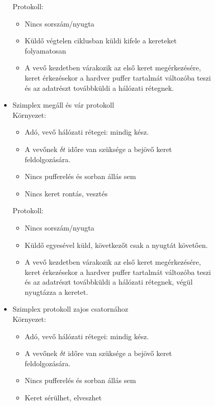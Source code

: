 \documentclass[margin=0px]{article}
\begin{document}
\begin{description}
\begin{description}
\begin{itemize}
							 	Protokoll:
							 	\begin{itemize}
							 		\item Nincs sorszám/nyugta
							 		\item Küldő végtelen ciklusban küldi kifele a kereteket folyamatosan
							 		\item A vevő kezdetben várakozik az első keret megérkezésére, keret érkezésekor a hardver puffer tartalmát változóba teszi és az adatrészt továbbküldi a hálózati rétegnek.
							 	\end{itemize}
						 	\item Szimplex megáll és vár protokoll 	\\
							 	Környezet:
							 	\begin{itemize}
							 		\item Adó, vevő hálózati rétegei: mindig kész.
							 		\item A vevőnek $\delta t$ időre van szüksége a bejövő keret feldolgozására.
							 		\item Nincs pufferelés és sorban állás sem
							 		\item Nincs keret rontás, vesztés
							 	\end{itemize}
							 	
							 	Protokoll:
							 	\begin{itemize}
							 		\item Nincs sorszám/nyugta
							 		\item Küldő egyesével küld, következőt csak a nyugtát követően.
							 		\item A vevő kezdetben várakozik az első keret megérkezésére, keret érkezésekor a hardver puffer tartalmát változóba teszi és az adatrészt továbbküldi a hálózati rétegnek, végül nyugtázza a keretet.
							 	\end{itemize}
						 	\item Szimplex protokoll zajos csatornához\\
							 	Környezet:
							 	\begin{itemize}
							 		\item Adó, vevő hálózati rétegei: mindig kész.
							 		\item A vevőnek $\delta t$ időre van szüksége a bejövő keret feldolgozására.
							 		\item Nincs pufferelés és sorban állás sem
							 		\item Keret sérülhet, elveszhet
							 	\end{itemize}
							 	

\end{itemize}
\end{description}
\end{description}
\end{document}
